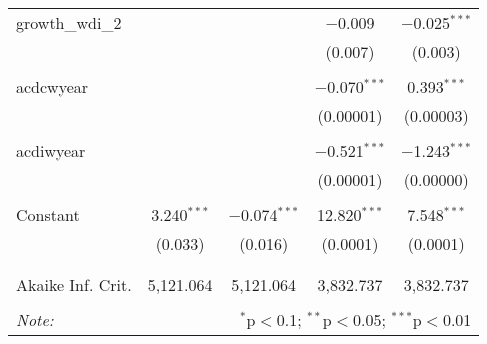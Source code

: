 \begin{table}[!htbp]
\begin{tabular}{@{\extracolsep{5pt}}lcccc}
 growth\_wdi\_2 &  &  & $-$0.009 & $-$0.025$^{***}$ \\ 
  &  &  & (0.007) & (0.003) \\ 
  & & & & \\ 
 acdcwyear &  &  & $-$0.070$^{***}$ & 0.393$^{***}$ \\ 
  &  &  & (0.00001) & (0.00003) \\ 
  & & & & \\ 
 acdiwyear &  &  & $-$0.521$^{***}$ & $-$1.243$^{***}$ \\ 
  &  &  & (0.00001) & (0.00000) \\ 
  & & & & \\ 
 Constant & 3.240$^{***}$ & $-$0.074$^{***}$ & 12.820$^{***}$ & 7.548$^{***}$ \\ 
  & (0.033) & (0.016) & (0.0001) & (0.0001) \\ 
  & & & & \\ 
\hline \\[-1.8ex] 
Akaike Inf. Crit. & 5,121.064 & 5,121.064 & 3,832.737 & 3,832.737 \\ 
\hline 
\hline \\[-1.8ex] 
\textit{Note:}  & \multicolumn{4}{r}{$^{*}$p$<$0.1; $^{**}$p$<$0.05; $^{***}$p$<$0.01} \\ 
\end{tabular} 
\end{table} 
